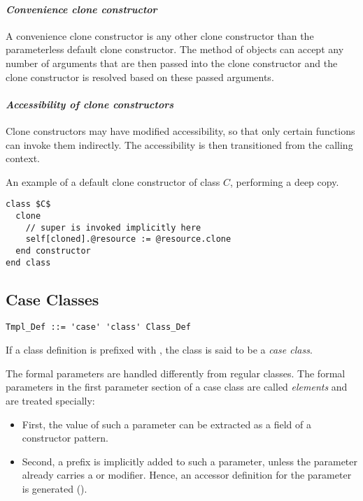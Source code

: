 \paragraph{\em Convenience clone constructor}
A convenience clone constructor is any other clone constructor than the parameterless default clone constructor. The  method of objects can accept any number of arguments that are then passed into the clone constructor and the clone constructor is resolved based on these passed arguments. 

\paragraph{\em Accessibility of clone constructors}
Clone constructors may have modified accessibility, so that only certain functions can invoke them indirectly. The accessibility is then transitioned from the calling context. 

\example An example of a default clone constructor of class $C$, performing a deep copy. 
\begin{lstlisting}
class $C$
  clone
    // super is invoked implicitly here
    self[cloned].@resource := @resource.clone
  end constructor
end class
\end{lstlisting}






\subsection{Case Classes}
\label{sec:case-classes}

\syntax\begin{lstlisting}
Tmpl_Def ::= 'case' 'class' Class_Def
\end{lstlisting}

If a class definition is prefixed with , the class is said to be a {\em case class}. 

The formal parameters are handled differently from regular classes. The formal parameters in the first parameter section of a case class are called {\em elements} and are treated specially:
\begin{itemize}
\item[] First, the value of such a parameter can be extracted as a field of a constructor pattern. 
\item[] Second, a  prefix is implicitly added to such a parameter, unless the parameter already carries a  or  modifier. Hence, an accessor definition for the parameter is generated (). 
\end{itemize}

